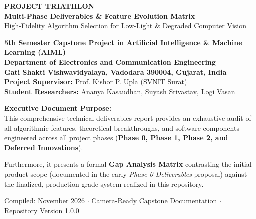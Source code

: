 \documentclass[10pt,a4paper]{article}
\begin{document}
\begin{titlepage}
    \centering
    \vspace*{1.0cm}
    {\Huge \bfseries \color{primaryblue} PROJECT TRIATHLON}\\[0.4cm]
    {\LARGE \bfseries Multi-Phase Deliverables \& Feature Evolution Matrix}\\[0.3cm]
    {\large \color{darkgray} High-Fidelity Algorithm Selection for Low-Light \& Degraded Computer Vision}\\[1.5cm]

    \begin{tcolorbox}[colback=lightgray,colframe=accentblue,arc=4mm,boxrule=1pt,width=0.95\textwidth]
        \centering \vspace{0.2cm}
        \textbf{\large 5th Semester Capstone Project in Artificial Intelligence \& Machine Learning (AIML)}\\[0.2cm]
        \textbf{Department of Electronics and Communication Engineering}\\
        \textbf{Gati Shakti Vishwavidyalaya, Vadodara 390004, Gujarat, India}\\[0.3cm]
        \textbf{Project Supervisor:} Prof. Kishor P. Upla (SVNIT Surat)\\
        \textbf{Student Researchers:} Ananya Kasaudhan, Suyash Srivastav, Logi Vasan\\[0.2cm]
    \end{tcolorbox}

    \vspace{1.5cm}

    \begin{minipage}{0.9\textwidth}
        \textbf{\large Executive Document Purpose:}\\[0.2cm]
        This comprehensive technical deliverables report provides an exhaustive audit of all algorithmic features, theoretical breakthroughs, and software components engineered across all project phases (\textbf{Phase 0, Phase 1, Phase 2, and Deferred Innovations}). 
        
        Furthermore, it presents a formal \textbf{Gap Analysis Matrix} contrasting the initial product scope (documented in the early \textit{Phase 0 Deliverables} proposal) against the finalized, production-grade system realized in this repository.
    \end{minipage}

    \vfill
    {\small \color{darkgray} Compiled: November 2026 $\cdot$ Camera-Ready Capstone Documentation $\cdot$ Repository Version 1.0.0}
\end{titlepage}
\end{document}
